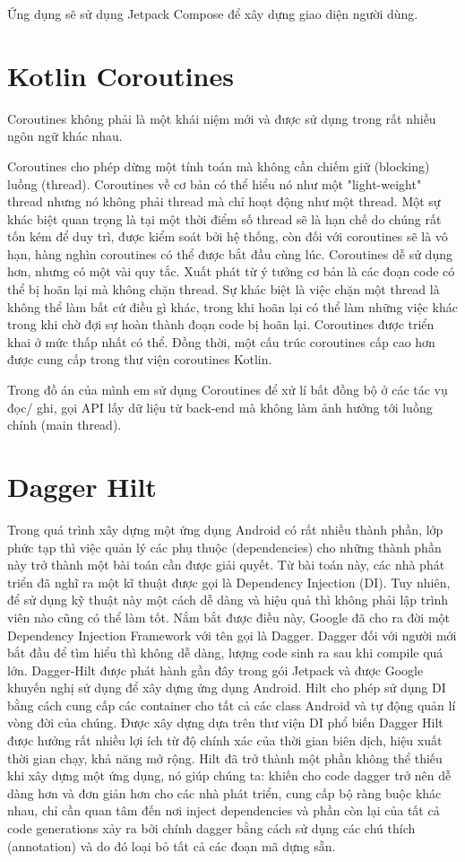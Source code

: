 \documentclass[../Main.tex]{subfiles}
\begin{document}
Ứng dụng sẽ sử dụng Jetpack Compose để xây dựng giao diện người dùng.  
\section{Kotlin Coroutines}
Coroutines không phải là một khái niệm mới và được sử dụng trong rất nhiều ngôn ngữ khác nhau. 

Coroutines \cite{Coroutines} cho phép dừng một tính toán mà không cần chiếm giữ (blocking) luồng (thread). Coroutines về cơ bản có thể hiểu nó như một "light-weight" thread nhưng nó không phải thread mà chỉ hoạt động như một thread. Một sự khác biệt quan trọng là tại một thời điểm số thread sẽ là hạn chế do chúng rất tốn kém để duy trì, được kiểm soát bởi hệ thống, còn đối với coroutines sẽ là vô hạn, hàng nghìn coroutines có thể được bắt đầu cùng lúc. Coroutines dễ sử dụng hơn, nhưng có một vài quy tắc. Xuất phát từ ý tưởng cơ bản là các đoạn code có thể bị hoãn lại mà không chặn thread. Sự khác biệt là việc chặn một thread là không thể làm bất cứ điều gì khác, trong khi hoãn lại có thể làm những việc khác trong khi chờ đợi sự hoàn thành đoạn code bị hoãn lại. Coroutines được triển khai ở mức thấp nhất có thể. Đồng thời, một cấu trúc coroutines cấp cao hơn được cung cấp trong thư viện coroutines Kotlin. 

Trong đồ án của mình em sử dụng Coroutines để xử lí bất đồng bộ ở các tác vụ đọc/ ghi, gọi API lấy dữ liệu từ back-end mà không làm ảnh hưởng tới luồng chính (main thread).

\section{Dagger Hilt}
Trong quá trình xây dựng một ứng dụng Android có rất nhiều thành phần, lớp phức tạp thì việc quản lý các phụ thuộc (dependencies) cho những thành phần này trở thành một bài toán cần được giải quyết. Từ bài toán này, các nhà phát triển đã nghĩ ra một kĩ thuật được gọi là Dependency Injection (DI). Tuy nhiên, để sử dụng kỹ thuật này một cách dễ dàng và hiệu quả thì không phải lập trình viên nào cũng có thể làm tốt. Nắm bắt được điều này, Google đã cho ra đời một Dependency Injection Framework với tên gọi là Dagger. Dagger đối với người mới bắt đầu để tìm hiểu thì không dễ dàng, lượng code sinh ra sau khi compile quá lớn. Dagger-Hilt \cite{Hilt1} được phát hành gần đây trong gói Jetpack và được Google khuyến nghị sử dụng để xây dựng ứng dụng Android. Hilt cho phép sử dụng DI bằng cách cung cấp các container cho tất cả các class Android và tự động quản lí vòng đời của chúng. Được xây dựng dựa trên thư viện DI phổ biến Dagger Hilt được hưởng rất nhiều lợi ích từ độ chính xác của thời gian biên dịch, hiệu xuất thời gian chạy, khả năng mở rộng. Hilt đã trở thành một phần không thể thiếu khi xây dựng một ứng dụng, nó giúp chúng ta: khiến cho code dagger trở nên dễ dàng hơn và đơn giản hơn cho các nhà phát triển, cung cấp bộ ràng buộc khác nhau, chỉ cần quan tâm đến nơi inject dependencies và phần còn lại của tất cả code generations xảy ra bởi chính dagger bằng cách sử dụng các chú thích (annotation) và do đó loại bỏ tất cả các đoạn mã dựng sẵn. 
\end{document}
